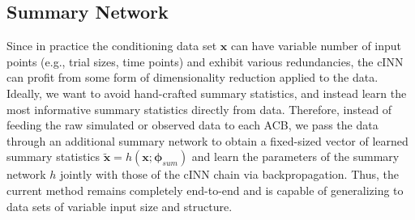 \documentclass[9pt,twoside,lineno]{pnas-new}
\begin{document}
\subsection*{Summary Network}
Since in practice the conditioning data set $\boldsymbol{x}$ can have variable number of input points (e.g., trial sizes, time points) and exhibit various redundancies, the cINN can profit from some form of dimensionality reduction applied to the data. Ideally, we want to avoid hand-crafted summary statistics, and instead learn the most informative summary statistics directly from data. Therefore, instead of feeding the raw simulated or observed data to each ACB, we pass the data through an additional summary network to obtain a fixed-sized vector of learned summary statistics $\tilde{\boldsymbol{x}} = h(\boldsymbol{x};\boldsymbol{\phi}_{sum})$ and learn the parameters of the summary network $h$ jointly with those of the cINN chain via backpropagation. Thus, the current method remains completely end-to-end and is capable of generalizing to data sets of variable input size and structure.
\end{document}
